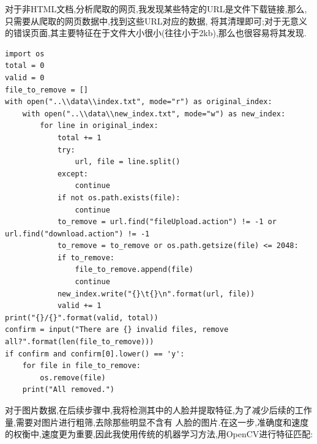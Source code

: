 \documentclass[a4paper]{article}
\begin{document}
对于非HTML文档,分析爬取的网页,我发现某些特定的URL是文件下载链接,那么,只需要从爬取的网页数据中,找到这些URL对应的数据,
将其清理即可;对于无意义的错误页面,其主要特征在于文件大小很小(往往小于2kb),那么也很容易将其发现.
\begin{verbatim}
import os
total = 0
valid = 0
file_to_remove = []
with open("..\\data\\index.txt", mode="r") as original_index:
    with open("..\\data\\new_index.txt", mode="w") as new_index:
        for line in original_index:
            total += 1
            try:
                url, file = line.split()
            except:
                continue
            if not os.path.exists(file):
                continue
            to_remove = url.find("fileUpload.action") != -1 or url.find("download.action") != -1
            to_remove = to_remove or os.path.getsize(file) <= 2048:
            if to_remove:
                file_to_remove.append(file)
                continue
            new_index.write("{}\t{}\n".format(url, file))
            valid += 1
print("{}/{}".format(valid, total))
confirm = input("There are {} invalid files, remove all?".format(len(file_to_remove)))
if confirm and confirm[0].lower() == 'y':
    for file in file_to_remove:
        os.remove(file)
    print("All removed.")
\end{verbatim}

对于图片数据,在后续步骤中,我将检测其中的人脸并提取特征,为了减少后续的工作量,需要对图片进行粗筛,去除那些明显不含有
人脸的图片.在这一步,准确度和速度的权衡中,速度更为重要,因此我使用传统的机器学习方法,用OpenCV进行特征匹配:
\end{document}
